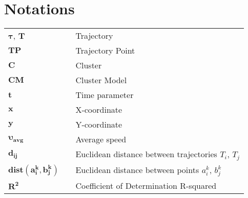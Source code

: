 \section*{Notations}
\label{ch:Notations}

\begin{tabular}{lll}
	\\
	$\bm{\tau}$, $\bm{T}$       	& & {Trajectory} \\[0.5ex]
	$\bm{TP}$        				& & {Trajectory Point} \\[0.5ex]
	$\bm{C}$        				& & {Cluster} \\[0.5ex]
	$\bm{CM}$        				& & {Cluster Model} \\[0.5ex]
	$\bm{t}$						& & {Time parameter} \\[0.5ex]
	$\bm{x}$						& & {X-coordinate} \\[0.5ex]
	$\bm{y}$						& & {Y-coordinate} \\[0.5ex]
	$\bm{\upsilon_{avg}}$			& & {Average speed} \\[0.5ex]
	$\bm{d_{ij}}$					& & {Euclidean distance between trajectories $T_i$, $T_j$} \\[0.5ex]
	$\bm{dist(a_i^k, b_j^k)}$		& & {Euclidean distance between points $a_i^k$, $b_j^k$} \\[0.5ex]
	$\bm{R^2}$						& & {Coefficient of Determination R-squared} \\[0.5ex]
	
\end{tabular}
